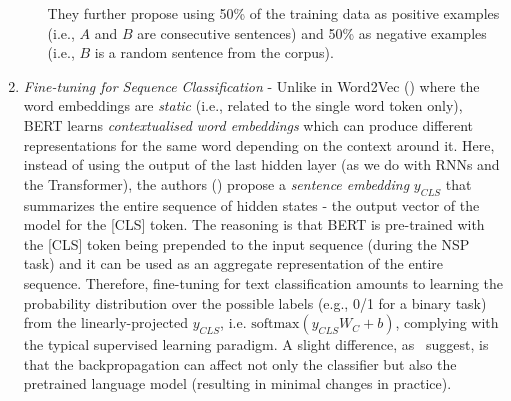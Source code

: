 \begin{enumerate}
\begin{enumerate}
        They further propose using 50\% of the training data as positive examples (i.e., $A$ and $B$ are consecutive sentences) and 50\% as negative examples (i.e., $B$ is a random sentence from the corpus).
    \end{enumerate}
    \item \emph{Fine-tuning for Sequence Classification} - Unlike in Word2Vec (\cite{mikolov2013efficient}) where the word embeddings are \emph{static} (i.e., related to the single word token only), BERT learns \emph{contextualised word embeddings} which can produce different representations for the same word depending on the context around it.
    Here, instead of using the output of the last hidden layer (as we do with RNNs and the Transformer), the authors (\cite{devlin-etal-2019-bert}) propose a \emph{sentence embedding} $y_{CLS}$ that summarizes the entire sequence of hidden states - the output vector of the model for the [CLS] token.
    The reasoning is that BERT is pre-trained with the [CLS] token being prepended to the input sequence (during the NSP task) and it can be used as an aggregate representation of the entire sequence.
    Therefore, fine-tuning for text classification amounts to learning the probability distribution over the possible labels (e.g., 0/1 for a binary task) from the linearly-projected $y_{CLS}$, i.e. $\text{softmax}(y_{CLS}W_{C} + b)$, complying with the typical supervised learning paradigm.
    A slight difference, as~\cite{jurafsky2000} suggest, is that the backpropagation can affect not only the classifier but also the pretrained language model (resulting in minimal changes in practice).
\end{enumerate}

